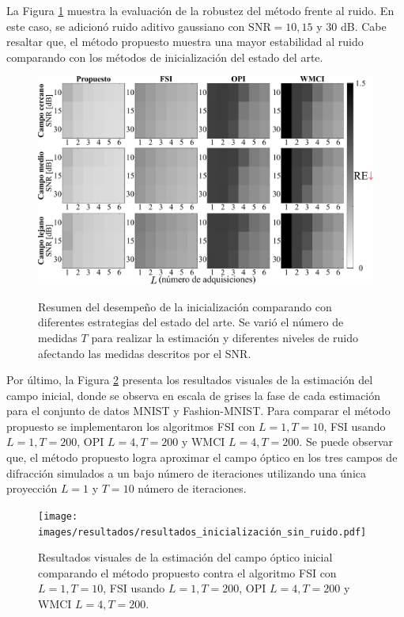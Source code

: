 La Figura \ref{fig:noisy_scenario} muestra la evaluación de la robustez del método frente al ruido. En este caso, se adicionó ruido aditivo gaussiano con $\mathrm{SNR} = 10, 15$ y $30$ dB. Cabe resaltar que, el método propuesto muestra una mayor estabilidad al ruido comparando con los métodos de inicialización del estado del arte.

\begin{figure}[!h]
    \caption{Resumen del desempeño de la inicialización comparando con diferentes estrategias del estado del arte. Se varió el número de medidas $T$ para realizar la estimación y diferentes niveles de ruido afectando las medidas descritos por el SNR.}
    \includegraphics[width=1\linewidth]{images/resultados/Noisy_Initializations.pdf}
    \label{fig:noisy_scenario}
\end{figure}

Por último, la Figura \ref{fig:resultados_inicialización_sin_ruido} presenta los resultados visuales de la estimación del campo inicial, donde se observa en escala de grises la fase de cada estimación para el conjunto de datos MNIST y Fashion-MNIST. Para comparar el método propuesto se implementaron los algoritmos FSI con $L = 1, T = 10$, FSI usando $L = 1, T=200$, OPI $L = 4, T=200$ y WMCI $L = 4, T=200$. Se puede observar que, el método propuesto logra aproximar el campo óptico en los tres campos de difracción simulados a un bajo número de iteraciones utilizando una única proyección $L=1$ y $T=10$ número de iteraciones.

\begin{figure}[!h]
    \centering
    \caption{Resultados visuales de la estimación del campo óptico inicial comparando el método propuesto contra el algoritmo FSI con $L = 1, T = 10$, FSI usando $L = 1, T=200$, OPI $L = 4, T=200$ y WMCI $L = 4, T=200$.}
    \texttt{[image: images/resultados/resultados\_inicialización\_sin\_ruido.pdf]}
    \label{fig:resultados_inicialización_sin_ruido}
\end{figure}

